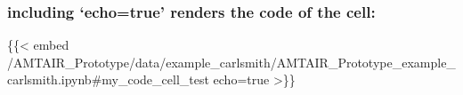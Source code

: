 \documentclass[
  11pt,
  letterpaper,
]{book}
\newenvironment{Shaded}{\begin{snugshade}}{\end{snugshade}}
\newcommand{\NormalTok}[1]{\textcolor[rgb]{0.00,0.23,0.31}{#1}}
\begin{document}
\subsubsection*{including `echo=true' renders the code of the
cell:}\label{including-echotrue-renders-the-code-of-the-cell}

\begin{Shaded}
\begin{Highlighting}[]
\NormalTok{\{\{\textless{} embed /AMTAIR\_Prototype/data/example\_carlsmith/AMTAIR\_Prototype\_example\_carlsmith.ipynb\#my\_code\_cell\_test echo=true \textgreater{}\}\}}
\end{Highlighting}
\end{Shaded}

\label{my_code_cell_test}
\end{document}
